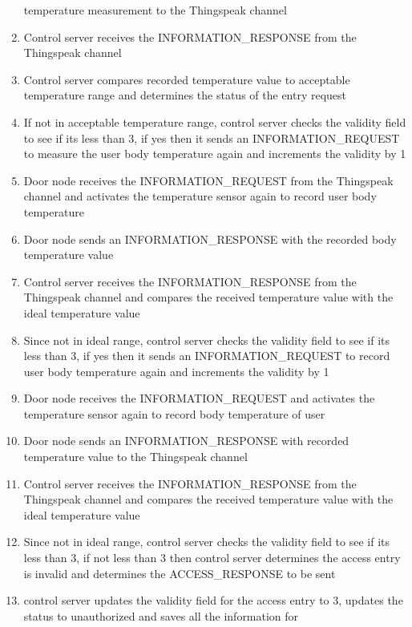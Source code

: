 \begin{enumerate}
          temperature measurement to the Thingspeak channel 
    \item Control server receives the INFORMATION\_RESPONSE from the Thingspeak
          channel
    \item Control server compares recorded temperature value to acceptable
          temperature range and determines the status of the entry request
    \item If not in acceptable temperature range, control server checks the
          validity field to see if its less than 3, if yes then it sends an
          INFORMATION\_REQUEST to measure the user body temperature again and
          increments the validity by 1 
    \item Door node receives the INFORMATION\_REQUEST from the Thingspeak
          channel and activates the temperature sensor again to record user body
          temperature
    \item Door node sends an INFORMATION\_RESPONSE with the recorded body
          temperature value
    \item Control server receives the INFORMATION\_RESPONSE from the Thingspeak
          channel and compares the received temperature value with the ideal
          temperature value
    \item Since not in ideal range, control server checks the validity field to
          see if its less than 3, if yes then it sends an INFORMATION\_REQUEST
          to record user body temperature again and increments the validity by 1 
    \item Door node receives the INFORMATION\_REQUEST and activates the
          temperature sensor again to record body temperature of user
    \item Door node sends an INFORMATION\_RESPONSE with recorded temperature
          value to the Thingspeak channel
    \item Control server receives the INFORMATION\_RESPONSE from the Thingspeak
          channel and compares the received temperature value with the ideal
          temperature value 
    \item Since not in ideal range, control server checks the validity field to
          see if its less than 3, if not less than 3 then control server
          determines the access entry is invalid and determines the
          ACCESS\_RESPONSE to be sent
    \item control server updates the validity field for the access entry to 3,
          updates the status to unauthorized and saves all the information for

\end{enumerate}
